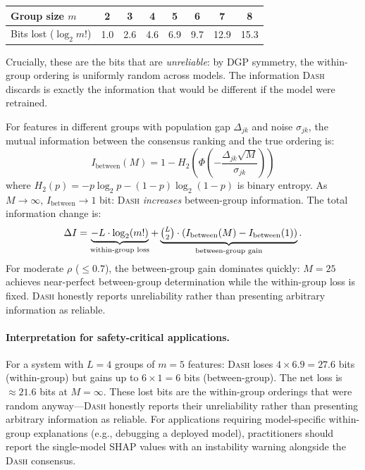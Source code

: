\documentclass{article}
\newcommand{\DASH}{\textsc{Dash}}
\begin{document}
\begin{center}
\small
\begin{tabular}{@{}lccccccc@{}}
\toprule
Group size $m$ & 2 & 3 & 4 & 5 & 6 & 7 & 8 \\
\midrule
Bits lost ($\log_2 m!$) & 1.0 & 2.6 & 4.6 & 6.9 & 9.7 & 12.9 & 15.3 \\
\bottomrule
\end{tabular}
\end{center}

Crucially, these are the bits that are \emph{unreliable}: by DGP symmetry, the within-group ordering is uniformly random across models. The information \DASH{} discards is exactly the information that would be different if the model were retrained.

For features in different groups with population gap $\Delta_{jk}$ and noise $\sigma_{jk}$, the mutual information between the consensus ranking and the true ordering is:
\[
    I_{\text{between}}(M) = 1 - H_2\!\left(\Phi\!\left(-\frac{\Delta_{jk}\sqrt{M}}{\sigma_{jk}}\right)\right)
\]
where $H_2(p) = -p\log_2 p - (1-p)\log_2(1-p)$ is binary entropy. As $M \to \infty$, $I_{\text{between}} \to 1$ bit: \DASH{} \emph{increases} between-group information. The total information change is:
\[
    \Delta I = \underbrace{-L \cdot \log_2(m!)}_{\text{within-group loss}} + \underbrace{\tbinom{L}{2} \cdot (I_{\text{between}}(M) - I_{\text{between}}(1))}_{\text{between-group gain}}.
\]
For moderate $\rho$ ($\leq 0.7$), the between-group gain dominates quickly: $M = 25$ achieves near-perfect between-group determination while the within-group loss is fixed. \DASH{} honestly reports unreliability rather than presenting arbitrary information as reliable.

\paragraph{Interpretation for safety-critical applications.}
For a system with $L = 4$ groups of $m = 5$ features: \DASH{} loses $4 \times 6.9 = 27.6$ bits (within-group) but gains up to $6 \times 1 = 6$ bits (between-group). The net loss is ${\approx}21.6$ bits at $M = \infty$. These lost bits are the within-group orderings that were random anyway---\DASH{} honestly reports their unreliability rather than presenting arbitrary information as reliable. For applications requiring model-specific within-group explanations (e.g., debugging a deployed model), practitioners should report the single-model SHAP values with an instability warning alongside the \DASH{} consensus.
\end{document}
